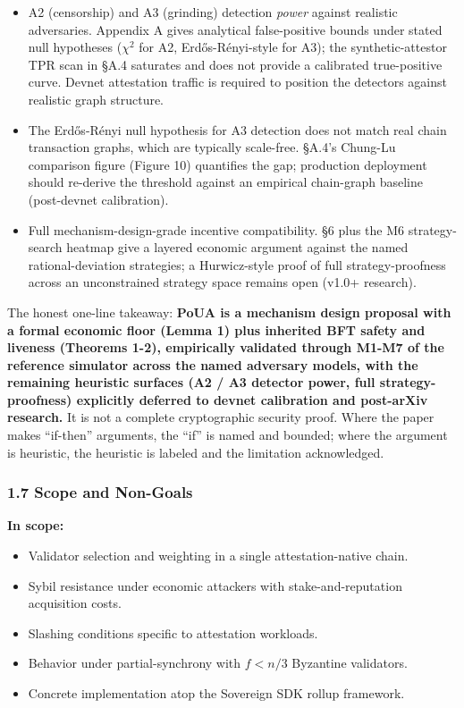 \documentclass[
  11pt,
]{article}
\providecommand{\tightlist}{%
  \setlength{\itemsep}{0pt}\setlength{\parskip}{0pt}}
\begin{document}
\begin{itemize}
\tightlist
\item
  A2 (censorship) and A3 (grinding) detection \emph{power} against
  realistic adversaries. Appendix A gives analytical false-positive
  bounds under stated null hypotheses (\(\chi^2\) for A2,
  Erdős-Rényi-style for A3); the synthetic-attestor TPR scan in §A.4
  saturates and does not provide a calibrated true-positive curve.
  Devnet attestation traffic is required to position the detectors
  against realistic graph structure.
\item
  The Erdős-Rényi null hypothesis for A3 detection does not match real
  chain transaction graphs, which are typically scale-free. §A.4's
  Chung-Lu comparison figure (Figure 10) quantifies the gap; production
  deployment should re-derive the threshold against an empirical
  chain-graph baseline (post-devnet calibration).
\item
  Full mechanism-design-grade incentive compatibility. §6 plus the M6
  strategy-search heatmap give a layered economic argument against the
  named rational-deviation strategies; a Hurwicz-style proof of full
  strategy-proofness across an unconstrained strategy space remains open
  (v1.0+ research).
\end{itemize}

The honest one-line takeaway: \textbf{PoUA is a mechanism design
proposal with a formal economic floor (Lemma 1) plus inherited BFT
safety and liveness (Theorems 1-2), empirically validated through M1-M7
of the reference simulator across the named adversary models, with the
remaining heuristic surfaces (A2 / A3 detector power, full
strategy-proofness) explicitly deferred to devnet calibration and
post-arXiv research.} It is not a complete cryptographic security proof.
Where the paper makes ``if-then'' arguments, the ``if'' is named and
bounded; where the argument is heuristic, the heuristic is labeled and
the limitation acknowledged.

\subsubsection{1.7 Scope and Non-Goals}\label{scope-and-non-goals}

\textbf{In scope:}

\begin{itemize}
\tightlist
\item
  Validator selection and weighting in a single attestation-native
  chain.
\item
  Sybil resistance under economic attackers with stake-and-reputation
  acquisition costs.
\item
  Slashing conditions specific to attestation workloads.
\item
  Behavior under partial-synchrony with \(f < n/3\) Byzantine
  validators.
\item
  Concrete implementation atop the Sovereign SDK rollup framework.
\end{itemize}
\end{document}
